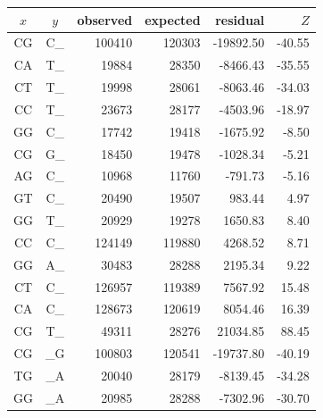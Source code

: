 \documentclass{article}
\newcommand{\nA}{\mbox{A}}  %
\newcommand{\nC}{\mbox{C}}
\newcommand{\nG}{\mbox{G}}
\newcommand{\nT}{\mbox{T}}
\theoremstyle{plain}
\theoremstyle{definition}
\begin{document}
\begin{table}
    \begin{center}
        \begin{tabular}{ccrrrr}
                $x$ & $y$ & observed &   expected &    residual &  $Z$ \\
                \hline
                \nC\nG  & \nC\_   & 100410   &  120303    & -19892.50   &	-40.55  \\
                \nC\nA  & \nT\_   &  19884   &   28350    &  -8466.43   &	-35.55  \\
                \nC\nT  & \nT\_   &  19998   &   28061    &  -8063.46   &	-34.03  \\
                \nC\nC  & \nT\_   &  23673   &   28177    &  -4503.96   &	-18.97  \\
                \nG\nG  & \nC\_   &  17742   &   19418    &  -1675.92   &	 -8.50  \\
                \nC\nG  & \nG\_   &  18450   &   19478    &  -1028.34   &	 -5.21  \\
                \nA\nG  & \nC\_   &  10968   &   11760    &   -791.73   &	 -5.16  \\
                \hline
                \nG\nT  & \nC\_   &  20490   &   19507    &    983.44   &  4.97   \\
                \nG\nG  & \nT\_   &  20929   &   19278    &   1650.83   &  8.40   \\
                \nC\nC  & \nC\_   & 124149   &  119880    &   4268.52   &  8.71   \\
                \nG\nG  & \nA\_   &  30483   &   28288    &   2195.34   &  9.22   \\
                \nC\nT  & \nC\_   & 126957   &  119389    &   7567.92   & 15.48   \\
                \nC\nA  & \nC\_   & 128673   &  120619    &   8054.46   & 16.39   \\
                \nC\nG  & \nT\_   &  49311   &   28276    &  21034.85   & 88.45   \\
                \hline
                \hline
                \nC\nG  &  \_\nG  &  100803  &  120541  &  -19737.80  &  -40.19 \\
                \nT\nG  &  \_\nA  &   20040  &   28179  &   -8139.45  &  -34.28 \\
                \nG\nG  &  \_\nA  &   20985  &   28288  &   -7302.96  &  -30.70 \\

\end{tabular}
\end{center}
\end{table}
\end{document}
